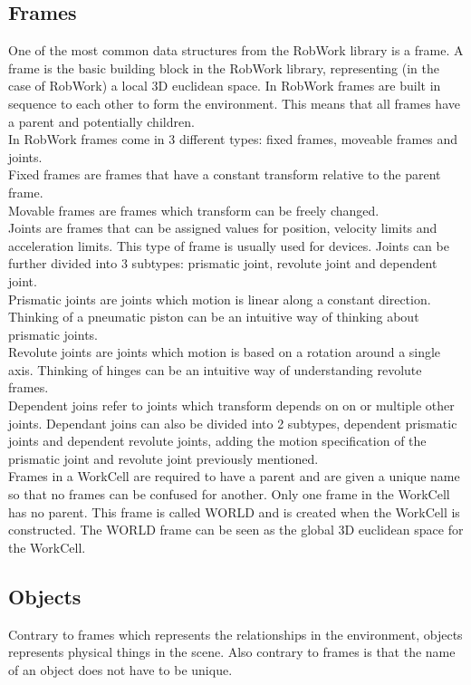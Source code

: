 \subsection{Frames}
One of the most common data structures from the RobWork library is a frame. A frame is the basic building block in the RobWork library, representing (in the case of RobWork) a local 3D euclidean space. In RobWork frames are built in sequence to each other to form the environment. This means that all frames have a parent and potentially children.\\

In RobWork frames come in 3 different types: fixed frames, moveable frames and joints.\\
Fixed frames are frames that have a constant transform relative to the parent frame.\\
Movable frames are frames which transform can be freely changed.\\
Joints are frames that can be assigned values for position, velocity limits and acceleration limits. This type of frame is usually used for devices. Joints can be further divided into 3 subtypes: prismatic joint, revolute joint and dependent joint.\\
Prismatic joints are joints which motion is linear along a constant direction. Thinking of a pneumatic piston can be an intuitive way of thinking about prismatic joints.\\
Revolute joints are joints which motion is based on a rotation around a single axis. Thinking of hinges can be an intuitive way of understanding revolute frames.\\
Dependent joins refer to joints which transform depends on on or multiple other joints. Dependant joins can also be divided into 2 subtypes, dependent prismatic joints and dependent revolute joints, adding the motion specification of the prismatic joint and revolute joint previously mentioned.\\

Frames in a WorkCell are required to have a parent and are given a unique name so that no frames can be confused for another. Only one frame in the WorkCell has no parent. This frame is called WORLD and is created when the WorkCell is constructed. The WORLD frame can be seen as the global 3D euclidean space for the WorkCell.


\subsection{Objects}
Contrary to frames which represents the relationships in the environment, objects represents physical things in the scene. Also contrary to frames is that the name of an object does not have to be unique.\\

